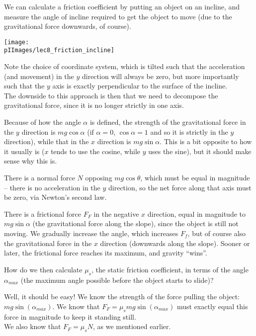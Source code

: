 We can calculate a friction coefficient by putting an object on an incline, and measure the angle of incline required to get the object to move (due to the gravitational force downwards, of course).

\begin{center}
\texttt{[image: \\pIImages/lec8\_friction\_incline]}
\end{center}

Note the choice of coordinate system, which is tilted such that the acceleration (and movement) in the $y$ direction will always be zero, but more importantly such that the $y$ axis is exactly perpendicular to the surface of the incline.\\
The downside to this approach is then that we need to decompose the gravitational force, since it is no longer strictly in one axis.

Because of how the angle $\alpha$ is defined, the strength of the gravitational force in the $y$ direction is $m g \cos \alpha$ (if $\alpha = 0$, $\cos \alpha = 1$ and so it is strictly in the $y$ direction), while that in the $x$ direction is $m g \sin \alpha$. This is a bit opposite to how it usually is ($x$ tends to use the cosine, while $y$ uses the sine), but it should make sense why this is.

There is a normal force $N$ opposing $m g \cos \theta$, which must be equal in magnitude -- there is no acceleration in the $y$ direction, so the net force along that axis must be zero, via Newton's second law.

There is a frictional force $F_F$ in the negative $x$ direction, equal in magnitude to $m g \sin \alpha$ (the gravitational force along the slope), since the object is still not moving. We gradually increase the angle, which increases $F_f$, but of course also the gravitational force in the $x$ direction (downwards along the slope). Sooner or later, the frictional force reaches its maximum, and gravity ``wins''.

How do we then calculate $\mu_s$, the static friction coefficient, in terms of the angle $\alpha_{max}$ (the maximum angle possible before the object starts to slide)?

Well, it should be easy! We know the strength of the force pulling the object: $m g \sin (\alpha_{max})$. We know that $F_F = \mu_s m g \sin (\alpha_{max})$ must exactly equal this force in magnitude to keep it standing still.\\
We also know that $F_F = \mu_s N$, as we mentioned earlier.

